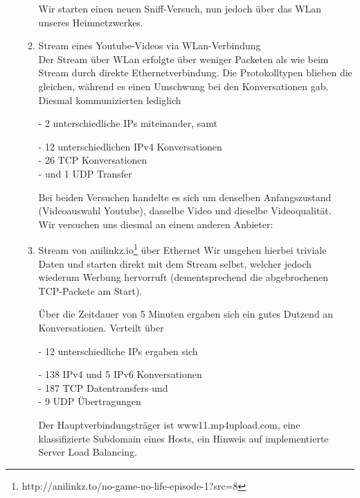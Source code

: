 \documentclass[11pt]{article}
\begin{document}
\begin{enumerate}
\begin{enumerate}[\thesection .1]
        Wir starten einen neuen Sniff-Versuch, nun jedoch über das WLan unseres Heimnetzwerkes.
        \item Stream eines Youtube-Videos via WLan-Verbindung\\
        Der Stream über WLan erfolgte über weniger Packeten als wie beim Stream durch direkte Ethernetverbindung.
        Die Protokolltypen blieben die gleichen, während es einen Umschwung bei den Konversationen gab.
        Diesmal kommunizierten lediglich
        \begin{addmargin}[1em]{1em}
            - 2 unterschiedliche IPs miteinander, samt
            \begin{addmargin}[1em]{1em}
                - 12 unterschiedlichen IPv4 Konversationen\\
                - 26 TCP Konversationen\\
                - und 1 UDP Transfer\\
            \end{addmargin}
        \end{addmargin}

            Bei beiden Versuchen handelte es sich um denselben Anfangszustand (Videoauswahl Youtube),
            dasselbe Video und dieselbe Videoqualität.\\

            Wir versuchen uns diesmal an einem anderen Anbieter:
            \item Stream von anilinkz.io\footnote[1]{http://anilinkz.to/no-game-no-life-episode-1?src=8} über Ethernet
            Wir umgehen hierbei triviale Daten und starten direkt mit dem Stream selbst, welcher jedoch wiederum Werbung hervorruft
            (dementsprechend die abgebrochenen TCP-Packete am Start).

            Über die Zeitdauer von 5 Minuten ergaben sich ein gutes Dutzend an Konversationen.
            Verteilt über
            \begin{addmargin}[1em]{1em}
                - 12 unterschiedliche IPs ergaben sich
                \begin{addmargin}[1em]{1em}
                    - 138 IPv4 und 5 IPv6 Konversationen\\
                    - 187 TCP Datentransfers und \\
                    - 9 UDP Übertragungen\\
                \end{addmargin}
            \end{addmargin}
            Der Hauptverbindungsträger ist www11.mp4upload.com, eine klassifizierte Subdomain eines Hosts, ein Hinweis auf implementierte Server Load Balancing.


\end{enumerate}
\end{enumerate}
\end{document}
